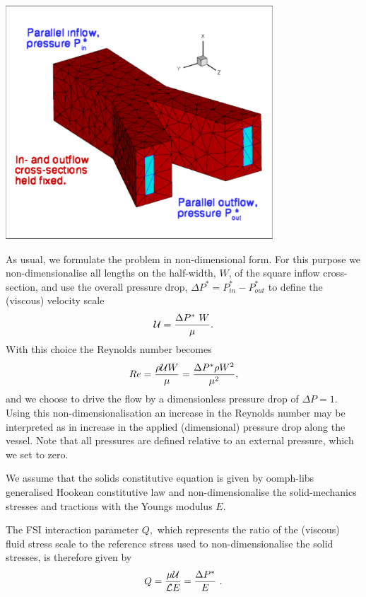  
\begin{DoxyImage}
\includegraphics[width=0.75\textwidth]{problem_sketch_backward}
\end{DoxyImage}


As usual, we formulate the problem in non-\/dimensional form. For this purpose we non-\/dimensionalise all lengths on the half-\/width, $ W $, of the square inflow cross-\/section, and use the overall pressure drop, $ \Delta P^* = P_{in}^* - P_{out}^* $ to define the (viscous) velocity scale \[ {\cal U} = \frac{\Delta P^*\ W}{\mu}. \] With this choice the Reynolds number becomes \[ Re = \frac{\rho {\cal U} W }{\mu} = \frac{ \Delta P^* \rho W^2 }{\mu^2}, \] and we choose to drive the flow by a dimensionless pressure drop of $ \Delta P = 1. $ Using this non-\/dimensionalisation an increase in the Reynolds number may be interpreted as in increase in the applied (dimensional) pressure drop along the vessel. Note that all pressures are defined relative to an external pressure, which we set to zero.

We assume that the solid\textquotesingle{}s constitutive equation is given by {\ttfamily oomph-\/lib\textquotesingle{}s} generalised Hookean constitutive law and non-\/dimensionalise the solid-\/mechanics stresses and tractions with the Young\textquotesingle{}s modulus $ E $.

The F\+SI interaction parameter $ Q, $ which represents the ratio of the (viscous) fluid stress scale to the reference stress used to non-\/dimensionalise the solid stresses, is therefore given by \[ Q = \frac{\mu {\cal U}}{{\cal L} E} = \frac{\Delta P^*}{E} \ . \]



